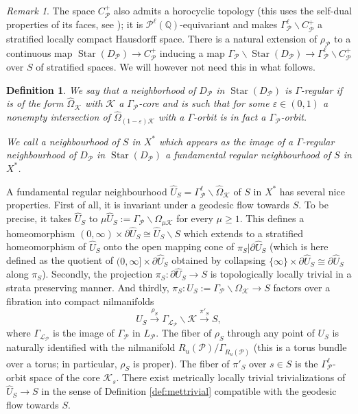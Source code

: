 \documentclass[12pt,letterpaper]{amsart}
\numberwithin{equation}{section}
\def\QQ{{\mathbb Q}}
\def\ssm{\smallsetminus}
\def\G{\Gamma}
\def\bs{\backslash}
\newcommand{\eps}{\varepsilon}
\newcommand{\p}{\partial}
\def\Kcal{{\mathcal K}}
\def\Lcal{{\mathcal L}}
\def\Pcal{{\mathcal P}}
\newcommand\Star{\operatorname{Star}}
\newtheorem{definition}{Definition}\numberwithin{definition}{section}
\theoremstyle{remark}
\newtheorem{remark}[theorem]{Remark}
\begin{document}
\begin{remark}
The  space $C^+_\Pcal$ also admits a horocyclic  topology (this uses the self-dual properties of its faces, see \cite{looij:cone}); it is 
$\Pcal^\ell(\QQ)$-equivariant 
and makes  $\G_\Pcal^\ell\bs C^+_\Pcal$ a stratified locally compact  Hausdorff space. There is a natural extension of $\rho_\Pcal$ to 
a continuous map $\Star(D_\Pcal)\to C^+_\Pcal$ inducing a map $\G_\Pcal\bs \Star(D_\Pcal)\to \G_\Pcal^\ell\bs C^+_\Pcal$ over $S$ of stratified spaces. We will however not need this in what follows.
\end{remark}


\begin{definition}\label{def:}
We say that a  neighborhood of $D_\Pcal$ in $\Star (D_\Pcal)$  is \emph{$\G$-regular} if is  of the form  $\hat\Omega_\Kcal$
with $\Kcal$  a  $\G_\Pcal$-core and is such that for some $\eps\in (0,1)$ a nonempty  intersection of $\hat\Omega_{(1-\eps)\Kcal}$ with a 
 $\G$-orbit is in fact a $\G_\Pcal$-orbit. 

We call a   neighbourhood of $S$ in $X^*$ which appears as the image of a $\G$-regular neighbourhood of $D_\Pcal$ in $\Star (D_\Pcal)$ a \emph{fundamental regular neighbourhood} of $S$ in $X^*$. 
\end{definition}

A fundamental regular neighbourhood $\hat U_S=\G_\Pcal^\ell\bs\hat\Omega_\Kcal$ of  $S$ in $X^*$ has several nice properties. First of all,  it  is invariant under a geodesic flow  towards $S$. To be precise,  it takes $\hat U_S$ to $\mu\hat U_S:=\G_\Pcal\bs \Omega_{\mu\Kcal}$ for every $\mu\ge 1$. This 
defines a homeomorphism $(0,\infty)\times \p\hat U_S\cong \hat U_S\ssm S$ which extends to a stratified homeomorphism of $\hat U_S$ onto the open mapping cone of $\pi_S|\p\hat U_S$ (which is here defined as the quotient of   $(0, \infty]\times  \p\hat U_S$ obtained by collapsing  $\{\infty\}\times  \p\hat U_S\cong \p\hat U_S$ along $\pi_S$). Secondly, 
the projection $\pi_S:\p\hat U_S\to S$ is topologically locally trivial in a strata preserving manner. And thirdly, 
$\pi_S: U_S:=\G_\Pcal\bs\Omega_\Kcal\to S$  factors  over a fibration  into compact  nilmanifolds
\begin{equation}\label{eqn:nilfactor}
 U_S\xrightarrow{\rho_S} \G_{\Lcal_\Pcal}\bs\Kcal\xrightarrow{\pi'_S} S,
\end{equation}
where $\G_{\Lcal_\Pcal}$ is the image of $\G_\Pcal$ in $L_\Pcal$. The fiber of $\rho_S$  through any  point of $ U_S$ is naturally 
identified with the nilmanifold $R_u(\Pcal)/\G_{R_u(\Pcal)}$ (this is a torus bundle over a torus; in particular, $\rho_S$ is proper). The fiber 
of $\pi'_S$ over $s\in S$ is the $\G_\Pcal^\ell$-orbit space of  the  core $\Kcal_s$. 
There exist metrically locally trivial trivializations of $\hat U_S\to S$ in the sense of Definition \ref{def:mettrivial} compatible with the 
geodesic flow towards $S$.
\end{document}
